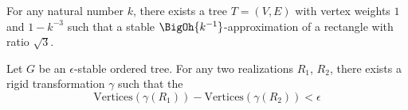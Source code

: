 \begin{lem}\label{lem:ContactGraphV3-1}
For any natural number $k$,  there exists a tree $T = (V,E)$ with vertex weights $1$ and $1 - k^{-3}$ such that a stable $\BigOh{k^{-1}}$-approximation of a rectangle with ratio $\sqrt{3}$.
\end{lem}

\begin{thm}
 Let $G$ be an $\epsilon$-stable ordered tree. For any two realizations $R_1$, $R_2$, there exists a rigid transformation $\gamma$ such that the $$\text{Vertices}\left(\gamma\left(R_1 \right)\right) - \text{Vertices}\left(\gamma\left(R_2\right)\right) < \epsilon$$
\end{thm}






